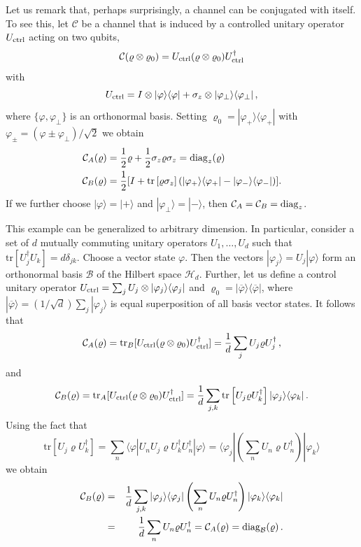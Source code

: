 \documentclass[12pt]{article}
\theoremstyle{definition}
\newcommand{\ket}[1]{|#1\rangle} %
\newcommand{\bra}[1]{\langle#1|} %
\newcommand{\tr}[1]{\textrm{tr}\left[#1\right]} %
\newcommand{\Cc}{\mathcal{C}} %
\begin{document}
{Let us remark that, perhaps surprisingly, a channel can be conjugated 
with itself. To see this, let $\Cc$ be a channel that is induced by a controlled unitary operator $U_{\rm ctrl}$ acting on two qubits,
\begin{equation}
\Cc(\varrho\otimes\varrho_0)=
U_{\rm ctrl}(\varrho\otimes\varrho_0)U_{\rm ctrl}^\dagger
\end{equation}
 with
\begin{equation}
U_{\rm ctrl}=I\otimes\ket{\varphi}\bra{\varphi}+\sigma_z\otimes\ket{\varphi_\perp}\bra{\varphi_\perp} \, ,
\end{equation}
where $\{\varphi,\varphi_\perp\}$ is an orthonormal basis. 
Setting $\varrho_0=\ket{\varphi_+}\bra{\varphi_+}$ with
$\varphi_{\pm}=(\varphi\pm\varphi_\perp)/\sqrt{2}$ we obtain
\begin{align}
\Cc_A(\varrho)&=\frac{1}{2}\varrho+\frac{1}{2}\sigma_z\varrho\sigma_z=
{\rm diag}_z(\varrho)\\
\Cc_B(\varrho)&=\frac{1}{2}[I+\tr{\varrho\sigma_z}
(\ket{\varphi_+}\bra{\varphi_+}-\ket{\varphi_-}\bra{\varphi_-})].
\end{align}
If we further choose $\ket{\varphi}=\ket{+}$ and $\ket{\varphi_\perp}=\ket{-}$, 
then $\Cc_A=\Cc_B={\rm diag}_z$. 

This example can be generalized to arbitrary dimension. In particular, consider
a set of $d$ mutually commuting unitary operators $U_1,\dots,U_d$ such that
$\tr{U_j^\dagger U_k}=d\delta_{jk}$. Choose a vector state $\varphi$. Then
the vectors $\ket{\varphi_j}=U_j\ket{\varphi}$ form an orthonormal basis 
$\mathcal{B}$
of the Hilbert space $\mathcal{H}_d$. Further, let us define a control unitary
operator $U_{\rm ctrl}=\sum_j U_j\otimes\ket{\varphi_j}\bra{\varphi_j}$ and
$\varrho_0=\ket{\overline{\varphi}}\bra{\overline{\varphi}}$, where
$\ket{\overline{\varphi}}=(1/\sqrt{d})\sum_j\ket{\varphi_j}$ is equal
superposition of all basis vector states. 
It follows that
\begin{equation}
\Cc_A(\varrho)={\rm tr}_B[U_{\rm ctrl}(\varrho\otimes\varrho_0)U_{\rm ctrl}^\dagger]=
\frac{1}{d}\sum_j U_j\varrho U_j^\dagger\,,
\end{equation}
and
\begin{equation}
\Cc_B(\varrho)={\rm tr}_A[U_{\rm ctrl}(\varrho\otimes\varrho_0)U_{\rm ctrl}^\dagger]=
\frac{1}{d}\sum_{j,k}\tr{U_j\varrho U_k^\dagger}\ket{\varphi_j}\bra{\varphi_k}\,.
\end{equation}
Using the fact that 
\begin{equation}
\tr{U_j\varrho U_k^\dagger}=
\sum_n \bra{\varphi} U_n U_j\varrho U_k^\dagger U_n^\dagger\ket{\varphi}
= \bra{\varphi_j}\left(\sum_n U_n\varrho U_n^\dagger\right)\ket{\varphi_k}
\end{equation}
we obtain
\begin{eqnarray*}
\Cc_B(\varrho)&=&\frac{1}{d}\sum_{j,k} \ket{\varphi_j}\bra{\varphi_j}
\left(\sum_n U_n\varrho U_n^\dagger\right)\ket{\varphi_k}\bra{\varphi_k}
\\ &=&\frac{1}{d}\sum_n U_n\varrho U_n^\dagger = \Cc_A (\varrho)
= {\rm diag}_{\mathcal{B}}(\varrho)\,.
\end{eqnarray*}

}
\end{document}
